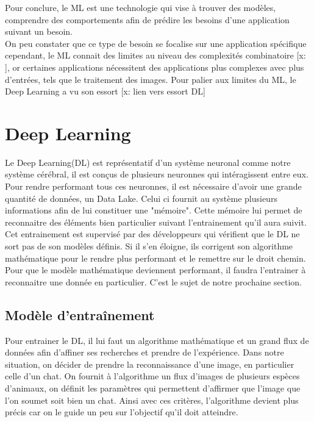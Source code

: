 \documentclass[12pt,a4paper]{report}
\begin{document}
Pour conclure, le ML est une technologie qui vise à trouver des modèles, comprendre des comportements afin de prédire les besoins d'une application suivant un besoin.\\

On peu constater que ce type de besoin se focalise sur une application spécifique cependant, le ML connait des limites au niveau des complexités combinatoire [x: ], or certaines applications nécessitent des applications plus complexes avec plus d'entrées, tels que le traitement des images. Pour palier aux limites du ML, le Deep Learning a vu son essort [x: lien vers essort DL]


\section{Deep Learning}

Le Deep Learning(DL) est représentatif d'un système neuronal comme notre système cérébral, il est conçus de plusieurs neuronnes qui intéragissent entre eux. Pour rendre performant tous ces neuronnes, il est nécessaire d'avoir une grande quantité de données, un Data Lake. Celui ci fournit au système plusieurs informations afin de lui constituer une "mémoire". Cette mémoire lui permet de reconnaitre des éléments bien particulier suivant l'entrainement qu'il aura suivit. Cet entrainement est supervisé par des développeurs qui vérifient que le DL ne sort pas de son modèles définis.
Si il s'en éloigne, ils corrigent son algorithme mathématique pour le rendre plus performant et le remettre sur le droit chemin. Pour que le modèle mathématique deviennent performant, il faudra l'entrainer à reconnaitre une donnée en particulier. C'est le sujet de notre prochaine section.


\pagebreak

\subsection{Modèle d'entraînement}

Pour entrainer le DL, il lui faut un algorithme mathématique et un grand flux de données afin d'affiner ses recherches et prendre de l'expérience. Dans notre situation, on décider de prendre la reconnaissance d'une image, en particulier celle d'un chat.
On fournit à l'algorithme un flux d'images de plusieurs espèces d'animaux, on définit les paramètres qui permettent d'affirmer que l'image que l'on soumet soit bien un chat. Ainsi avec ces critères, l'algorithme devient plus précis car on le guide un peu sur l'objectif qu'il doit atteindre.
 
\end{document}
